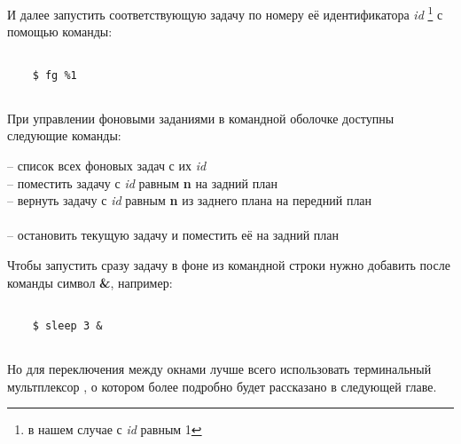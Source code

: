 И далее запустить соответствующую задачу по номеру её идентификатора \textit{id} \footnote{в нашем случае с \textit{id} равным 1} с помощью команды:
\begin{lstlisting}
	
	$ fg %1
	
\end{lstlisting}	

При управлении фоновыми заданиями в командной оболочке  доступны следующие команды:

\noindent
{} -- список всех фоновых задач с их \textit{id}\\
 -- поместить задачу с \textit{id} равным \textbf{n} на задний план\\
 -- вернуть задачу с \textit{id} равным \textbf{n} из заднего плана на передний план\\
\\
 -- остановить текущую задачу и поместить её на задний план

Чтобы запустить сразу задачу в фоне из командной строки нужно добавить после команды символ \textbf{\&}, например:
\begin{lstlisting}
	
	$ sleep 3 &
	
\end{lstlisting}	

Но для переключения между окнами лучше всего использовать терминальный мультплексор , о котором более подробно будет рассказано в следующей главе.
